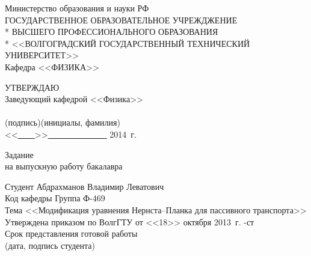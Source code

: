 \begin{titlepage}
\begin{center}
Министерство образования и науки РФ \\
\vspace{.5cm}
ГОСУДАРСТВЕННОЕ ОБРАЗОВАТЕЛЬНОЕ УЧРЕЖДЖЕНИЕ\\*
ВЫСШЕГО ПРОФЕССИОНАЛЬНОГО ОБРАЗОВАНИЯ\\*
<<ВОЛГОГРАДСКИЙ ГОСУДАРСТВЕННЫЙ ТЕХНИЧЕСКИЙ УНИВЕРСИТЕТ>>\\
\vspace{.5cm}
Кафедра <<ФИЗИКА>>
\vspace{.5cm}
\end{center}
\begin{flushright}
УТВЕРЖДАЮ\\
Заведующий кафедрой <<Физика>>\\
\vspace{.3cm}
\underline{\hspace{2cm}}\hspace{1cm}\underline{\hspace{4cm}}\\
\vspace{-.2cm}\footnotesize(подпись)\hspace{1.8cm}(инициалы, фамилия)\hspace*{.2cm}\ \normalsize\\
\vspace{.3cm}
<<\underline{\ \ \ \ }>>\underline{\ \ \ \ \ \ \ \ \ \ \ \ \ \ } 2014~г.
\end{flushright}
\begin{center}
\large Задание \\
\normalsize на выпускную работу бакалавра
\end{center}
\begin{flushleft}
Студент Абдрахманов Владимир Леватович\\
Код кафедры \underline{\hspace{3cm}}\hspace{6cm}Группа Ф-469\\
Тема <<Модификация уравнения Нернста--Планка для пассивного транспорта>>\\
Утверждена приказом по ВолгГТУ от <<18>> октября 2013~г. -ст\\
Срок представления готовой работы \underline{\hspace{6cm}}\\
\vspace{-.2cm}\hspace{9.5cm}\footnotesize(дата, подпись студента)\normalsize\\

\end{flushleft}
\end{titlepage}
